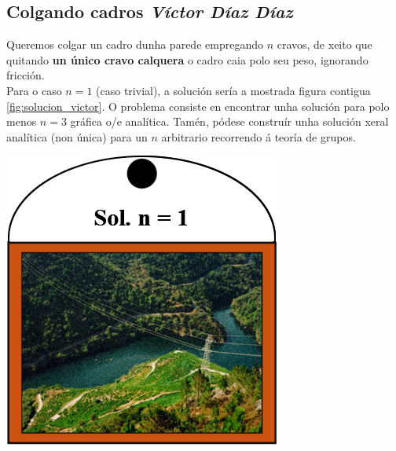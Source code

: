 \begin{refsection}
\newpage

\section*{\textcolor{Resalte}{Colgando cadros} {\normalfont \itshape Víctor Díaz Díaz}}%

\begin{multicols}{2}

Queremos colgar un cadro dunha parede empregando $n$ cravos, de xeito que
quitando \textbf{un único cravo calquera} o cadro caia polo seu peso, ignorando
fricción.\\
Para o caso $n=1$ (caso trivial), a solución sería a mostrada figura contigua \ref{fig:solucion_victor}. O problema consiste en encontrar unha solución para polo menos $n=3$ gráfica o/e analítica. Tamén, pódese construír unha solución xeral analítica (non única) para un $n$ arbitrario recorrendo á teoría de grupos.

\nocite{Demaine_2013}
\printbibliography
\hfill
\goodbreak

\begin{center}
    \captionsetup{justification=centering}
    \includegraphics[width=0.7\linewidth]{revistas/002/imaxes/solucion_victor.png}
    \label{fig:solucion_victor}
\end{center}

\end{multicols}
\end{refsection}
